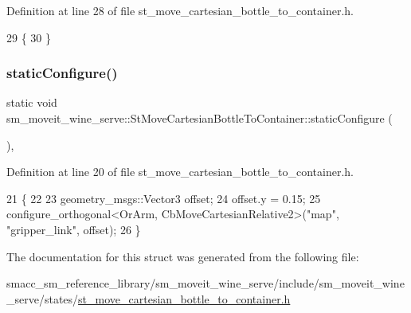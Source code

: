 Definition at line 28 of file st\+\_\+move\+\_\+cartesian\+\_\+bottle\+\_\+to\+\_\+container.\+h.


\begin{DoxyCode}
29         \{
30         \}
\end{DoxyCode}
\mbox{\label{structsm__moveit__wine__serve_1_1StMoveCartesianBottleToContainer_a281ad74e2a197f5273b1b1105c7b671a}} 
\subsubsection{\texorpdfstring{static\+Configure()}{staticConfigure()}}
{\footnotesize\ttfamily static void sm\+\_\+moveit\+\_\+wine\+\_\+serve\+::\+St\+Move\+Cartesian\+Bottle\+To\+Container\+::static\+Configure (\begin{DoxyParamCaption}{ }\end{DoxyParamCaption})\hspace{0.3cm}{\ttfamily [inline]}, {\ttfamily [static]}}



Definition at line 20 of file st\+\_\+move\+\_\+cartesian\+\_\+bottle\+\_\+to\+\_\+container.\+h.


\begin{DoxyCode}
21         \{
22 
23             geometry\_msgs::Vector3 offset;
24             offset.y = 0.15;
25             configure\_orthogonal<OrArm, CbMoveCartesianRelative2>(\textcolor{stringliteral}{"map"}, \textcolor{stringliteral}{"gripper\_link"}, offset);
26         \}
\end{DoxyCode}


The documentation for this struct was generated from the following file\+:\begin{DoxyCompactItemize}
\item 
smacc\+\_\+sm\+\_\+reference\+\_\+library/sm\+\_\+moveit\+\_\+wine\+\_\+serve/include/sm\+\_\+moveit\+\_\+wine\+\_\+serve/states/\hyperlink{st__move__cartesian__bottle__to__container_8h}{st\+\_\+move\+\_\+cartesian\+\_\+bottle\+\_\+to\+\_\+container.\+h}\end{DoxyCompactItemize}
